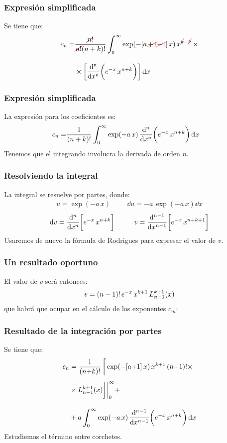 \documentclass[12pt]{beamer}
\begin{document}
\begin{frame}
\frametitle{Expresión simplificada}
Se tiene que:
\pause
\begin{align*}
c_{n} = &\dfrac{ \Cancel[red]{n}!}{\Cancel[red]{n!} (n+ k)!} \, \scaleint{6ex}_{\bs 0}^{\infty} \exp( -[ a \, \Cancel[red]{+ 1} \Cancel[red]{- 1}] \, x) \, x^{\Cancel[red]{k}-\Cancel[red]{k}} \, \times \\[1em]  
&\times \bigg[ \dv[n]{x} \bigg( e^{-x} \, x^{n+k} \bigg) \bigg] \dd{x}
\end{align*}
\end{frame}
\begin{frame}
\frametitle{Expresión simplificada}
La expresión para los coeficientes es:
\pause
\begin{align*}
c_{n} = &\dfrac{ 1}{(n+ k)!} \, \scaleint{6ex}_{\bs 0}^{\infty} \exp( - a \, x) \, \dv[n]{x} \bigg( e^{-x} \, x^{n+k} \bigg) \dd{x}
\end{align*}
Tenemos que el integrando involucra la derivada de orden $n$.
\end{frame}
\begin{frame}
\frametitle{Resolviendo la integral}
La integral se resuelve por partes, donde:
\pause
\begin{align*}
u = \exp(-a \, x) \hspace{1cm} \dd{u} = - a \, \exp(-a \, x) \dd{x} 
\end{align*}
\pause
\begin{align*}
\dd{v} = \dv[n]{x} \bigg[ e^{-x} \, x^{n+k} \bigg] \hspace{1cm} v = \dv[n-1]{x} \bigg[ e^{-x} \, x^{n+k+1} \bigg]
\end{align*}
\pause
Usaremos de nuevo la fórmula de Rodrigues para expresar el valor de $v$.
\end{frame}
\begin{frame}
\frametitle{Un resultado oportuno}
El valor de $v$ será entonces:
\pause
\begin{align*}
v = (n - 1)! \, e^{-x} \, x^{k+1} \, \scaleto{L_{n-1}^{k+1}(x)}{3ex}
\end{align*}
\pause
que habrá que ocupar en el cálculo de los exponentes $c_{m}$:
\end{frame}
\begin{frame}
\frametitle{Resultado de la integración por partes}
Se tiene que:
\pause
\begin{align*}
c_{n} &= \dfrac{ 1}{(n {+} k)!} \, \bigg[ \exp(-[a {+} 1] \, x) \, x^{k+1} \, (n {-} 1)! \times \\[0.5em]
&\times L_{n-1}^{k+1}(x) \bigg] \bigg\vert_{0}^{\infty} + \\[1em]
&+ a \, \scaleint{6ex}_{\bs 0}^{\infty} \exp( - a \, x) \, \dv[n-1]{x} \bigg( e^{-x} \, x^{n+k} \bigg) \dd{x}
\end{align*}
\pause
Estudiemos el término entre corchetes.
\end{frame}
\end{document}
